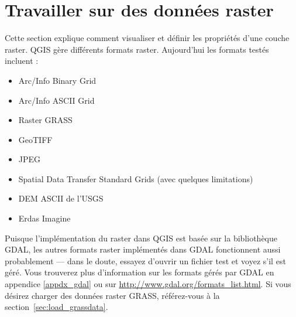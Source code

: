 \section{Travailler sur des données raster}\label{label_raster}


Cette section explique comment visualiser et définir les propriétés d'une couche
raster. QGIS gère différents formats raster. Aujourd'hui les formats testés
incluent :
\begin{itemize}
\item Arc/Info Binary Grid
\item Arc/Info ASCII Grid
\item Raster GRASS
\item GeoTIFF
\item JPEG
\item Spatial Data Transfer Standard Grids (avec quelques limitations)
\item DEM ASCII de l'USGS
\item Erdas Imagine
\end{itemize}

Puisque l'implémentation du raster dans QGIS est basée sur la bibliothèque
GDAL, les autres formats raster implémentés dans GDAL fonctionnent aussi
probablement — dans le doute, essayez d'ouvrir un fichier test et voyez s'il est
géré. Vous trouverez plus d'information sur les formats gérés par GDAL  en
appendice \ref{appdx_gdal}  ou sur
\url{http://www.gdal.org/formats_list.html}. Si vous désirez charger des
données raster GRASS, référez-vous à la section~\ref{sec:load_grassdata}.

